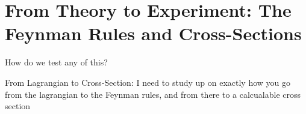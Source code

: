 \section{From Theory to Experiment: The Feynman Rules and Cross-Sections}

     How do we test any of this?
        
    From Lagrangian to Cross-Section:
        I need to study up on exactly how you go from the lagrangian to the Feynman rules, and from there to a calcualable cross section



